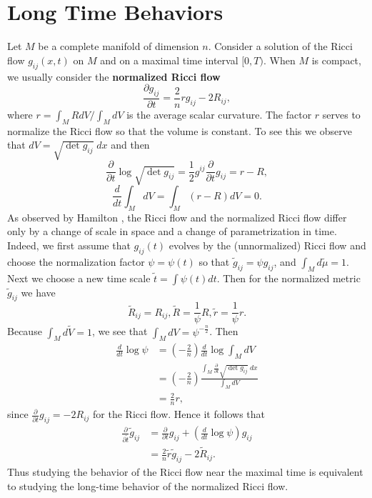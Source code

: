 
\chapter{Long Time Behaviors}
\label{chap:cz-long-time-behavior}

\bigskip
Let $M$ be a complete manifold of dimension $n$. Consider a
solution of the Ricci flow $g_{ij}(x,t)$ on $M$ and on a maximal
time interval $[0,T)$. When $M$ is compact, we usually consider
the \textbf{normalized Ricci flow} 
$$
\frac{\partial g_{ij}}{\partial t}=\frac{2}{n}rg_{ij}-2R_{ij},
$$
where $r=\int_MRdV/\int_MdV$ is the average scalar curvature. The
factor $r$ serves to normalize the Ricci flow so that the volume
is constant. To see this we observe that $dV=\sqrt{\det
g_{ij}}\;dx$ and then
$$
\frac{\partial}{\partial t}\log\sqrt{\det g_{ij}}
=\frac{1}{2}g^{ij}\frac{\partial}{\partial t}g_{ij}=r-R,
$$
$$
\frac{d}{dt}\int_MdV=\int_M(r-R)dV=0.
$$
As observed by Hamilton \cite{Ha82}, the Ricci flow and the
normalized Ricci flow differ only by a change of scale in space
and a change of parametrization in time. Indeed, we first assume
that $g_{ij}(t)$ evolves by the (unnormalized) Ricci flow and
choose the normalization factor $\psi=\psi(t)$ so that
$\tilde{g}_{ij}=\psi g_{ij}$, and $\int_Md\tilde{\mu}=1$. Next we
choose a new time scale $\tilde{t}=\int\psi(t)dt$. Then for the
normalized metric $\tilde{g}_{ij}$ we have
$$
\tilde{R}_{ij}=R_{ij}, \tilde{R}=\frac{1}{\psi}R,
\tilde{r}=\frac{1}{\psi}r.
$$
Because $\int_Md\tilde{V}=1$, we see that
$\int_MdV=\psi^{-\frac{n}{2}}$. Then
\begin{align*}
\frac{d}{dt}\log\psi&  =\left(-\frac{2}{n}\right)\frac{d}{dt}\log\int_MdV\\
&  = \left(-\frac{2}{n}\right)\frac{\int_M\frac{\partial}{\partial
t}\sqrt{\det g_{ij}}\;dx}{\int_MdV}\\
&  = \frac{2}{n}r,
\end{align*}
since $\frac{\partial}{\partial t}g_{ij}=-2R_{ij}$ for the Ricci
flow. Hence it follows that
\begin{align*}
\frac{\partial}{\partial \tilde{t}}\tilde{g}_{ij}& =
\frac{\partial}{\partial t}g_{ij}+\left(\frac{d}{dt}\log\psi\right)g_{ij}\\
&  = \frac{2}{n}\tilde{r}\tilde{g}_{ij}-2\tilde{R}_{ij}.
\end{align*}
Thus studying the behavior of the Ricci flow near the maximal time
is equivalent to studying the long-time behavior of the normalized
Ricci flow.


